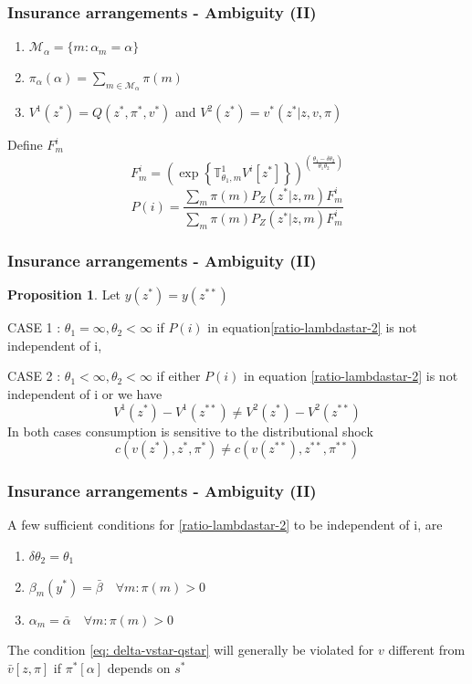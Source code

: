 \documentclass{beamer}
\theoremstyle{definition}
\newtheorem{proposition}{Proposition}%
\begin{document}
\begin{frame}
\frametitle{Insurance arrangements - Ambiguity (II) }
%
\begin{enumerate}
	\item $\mathcal{M}_{\alpha} = \{m : \alpha_m=\alpha\}$ 
	\item $\pi_\alpha (\alpha)=\sum_{m \in \mathcal{M}_{\alpha}}{ \pi(m)}$
	\item $V^1(z^*)=Q(z^*,\pi^*,v^*)$ and $V^2(z^*)=v^*(z^*|z,v,\pi)$
\end{enumerate}

Define $F_{m}^i$
\[F_{m}^i=\left(\exp\left \{
\mathbb{T}^1_{\theta_1,m}V^i[z^*]
\right\}
\right)^{\left(\frac{\theta_1-\delta\theta_2}{\theta_1\theta_2}\right)}
\]
\begin{equation}
\label{ratio-lambdastar-2}
P(i)=\frac{\sum_{m}\pi(m)P_Z(z^*|z,m)F^i_m
}
{\sum_{m}\pi(m)P_Z(z^*|z,m)F^i_m
}
\end{equation}
\end{frame}

\begin{frame}
\frametitle{Insurance arrangements - Ambiguity (II) }
\begin{proposition}
\label{propo-5}
%
Let $y(z^*)=y(z^{**})$

\noindent CASE 1 : $\theta_1=\infty,\theta_2 < \infty$
if $P(i)$ in equation\ref{ratio-lambdastar-2} is not independent of i,

%
%
\noindent CASE 2 : $\theta_1 <\infty ,\theta_2 < \infty$
if either $P(i)$ in equation \ref{ratio-lambdastar-2} is not independent of i or we have 
\begin{equation}
\label{eq: delta-vstar-qstar}
V^1(z^*)-V^1(z^{**}) \neq V^2(z^*)-V^2(z^{**}) 
\end{equation}
In both cases consumption is sensitive to the distributional shock
\[c(v(z^*),z^*,\pi^*)\neq c(v(z^{**}),z^{**},\pi^{**})\]
\end{proposition}
\end{frame}

\begin{frame}
\frametitle{Insurance arrangements - Ambiguity (II) }
A few sufficient conditions for \ref{ratio-lambdastar-2} to be independent of i, are
%
\begin{enumerate}
\item $\delta \theta_2=\theta_1$
\item $\beta_m(y^*) = \bar{\beta} \quad \forall m : \pi(m) >0$
\item $\alpha_m = \bar{\alpha} \quad \forall m : \pi(m) >0$
\end{enumerate}
The condition \ref{eq: delta-vstar-qstar} will generally be violated for $v$ different from $\bar{v}[z,\pi]$ if $\pi^{*}[\alpha]$ depends on $s^*$
\end{frame}
\end{document}
